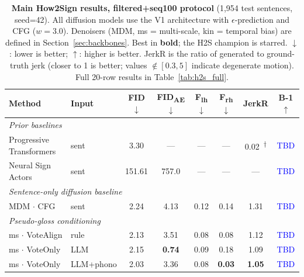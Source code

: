 \documentclass{article}
\newcommand{\placeholder}[1]{\textcolor{blue}{#1}}
\begin{document}
\begin{table}[t]
  \caption{\textbf{Main How2Sign results, filtered+seq100 protocol} (1,954 test sentences, seed=42). All diffusion models use the V1 architecture with $\epsilon$-prediction and CFG ($w=3.0$). Denoisers (MDM, ms = multi-scale, kin = temporal bias) are defined in Section~\ref{sec:backbones}. Best in \textbf{bold}; the H2S champion is starred. $\downarrow$: lower is better; $\uparrow$: higher is better. JerkR is the ratio of generated to ground-truth jerk (closer to 1 is better; values $\notin [0.3, 5]$ indicate degenerate motion). Full 20-row results in Table~\ref{tab:h2s_full}.}
  \label{tab:main_results}
  \centering
  \small
  \begin{tabular}{llcccccc}
    \toprule
    \textbf{Method} & \textbf{Input} & \textbf{FID}$\downarrow$ & \textbf{FID\textsubscript{AE}}$\downarrow$ & \textbf{F\textsubscript{lh}}$\downarrow$ & \textbf{F\textsubscript{rh}}$\downarrow$ & \textbf{JerkR} & \textbf{B-1}$\uparrow$ \\
    \midrule
    \multicolumn{8}{l}{\textit{Prior baselines}} \\
    \quad Progressive Transformers & sent & 3.30           & ---           & ---           & ---           & 0.02 $\,$\textsuperscript{$\dagger$} & \placeholder{TBD} \\
    \quad Neural Sign Actors       & sent & 151.61         & 757.0         & ---           & ---           & ---  & \placeholder{TBD} \\
    \midrule
    \multicolumn{8}{l}{\textit{Sentence-only diffusion baseline}} \\
    \quad MDM $\cdot$ CFG                                          & sent           & 2.24          & 4.13          & 0.12          & 0.14          & 1.31          & \placeholder{TBD} \\
    \midrule
    \multicolumn{8}{l}{\textit{Pseudo-gloss conditioning}} \\
    \quad ms  $\cdot$ VoteAlign                                    & rule           & 2.13          & 3.51          & 0.08          & 0.08          & 1.12          & \placeholder{TBD} \\
    \quad ms  $\cdot$ VoteOnly                                     & LLM            & 2.15          & \textbf{0.74} & 0.09          & 0.18          & 1.09          & \placeholder{TBD} \\
    \quad ms  $\cdot$ VoteOnly                                     & LLM+phono      & 2.03          & 3.36          & 0.08          & \textbf{0.03} & \textbf{1.05} & \placeholder{TBD} \\

\end{tabular}
\end{table}
\end{document}
